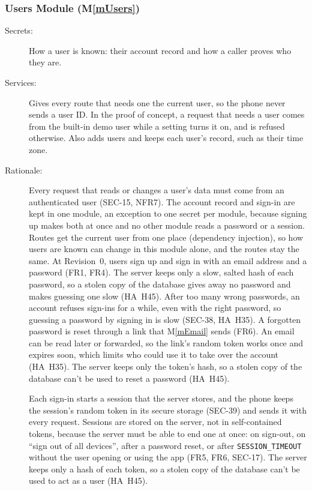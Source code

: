 \documentclass[12pt, titlepage]{article}
\newcommand{\mref}[1]{M\ref{#1}}
\begin{document}
\subsubsection{Users Module (\mref{mUsers})}

\begin{description}
\item[Secrets:] How a user is known: their account record and how a caller proves who they are.
\item[Services:] Gives every route that needs one the current user, so the phone never sends a user ID. In the proof of concept, a request that needs a user comes from the built-in demo user while a setting turns it on, and is refused otherwise. Also adds users and keeps each user's record, such as their time zone.
\item[Rationale:] Every request that reads or changes a user's data must come from an authenticated user (\mbox{SEC-15}, NFR7). The account record and sign-in are kept in one module, an exception to one secret per module, because signing up makes both at once and no other module reads a password or a session. Routes get the current user from one place (dependency injection), so how users are known can change in this module alone, and the routes stay the same. At Revision~0, users sign up and sign in with an email address and a password (FR1, FR4). The server keeps only a slow, salted hash of each password, so a stolen copy of the database gives away no password and makes guessing one slow (HA~H45). After too many wrong passwords, an account refuses sign-ins for a while, even with the right password, so guessing a password by signing in is slow (\mbox{SEC-38}, HA~H35). A forgotten password is reset through a link that \mref{mEmail} sends (FR6). An email can be read later or forwarded, so the link's random token works once and expires soon, which limits who could use it to take over the account (HA~H35). The server keeps only the token's hash, so a stolen copy of the database can't be used to reset a password (HA~H45).

Each sign-in starts a session that the server stores, and the phone keeps the session's random token in its secure storage (\mbox{SEC-39}) and sends it with every request. Sessions are stored on the server, not in self-contained tokens, because the server must be able to end one at once: on sign-out, on ``sign out of all devices'', after a password reset, or after \texttt{SESSION\_TIMEOUT} without the user opening or using the app (FR5, FR6, \mbox{SEC-17}). The server keeps only a hash of each token, so a stolen copy of the database can't be used to act as a user (HA~H45).


\end{description}
\end{document}
